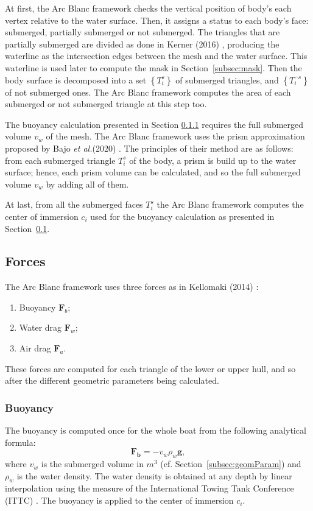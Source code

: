 \documentclass[final]{jcgt}
\def\Framework{The Arc Blanc framework\xspace}
\def\framework{the Arc Blanc framework\xspace}
\def\etal{\emph{et al.}\xspace}
\begin{document}
At first, \framework checks the vertical position of body's each vertex relative to the water surface.
Then, it assigns a status to each body's face: submerged, partially submerged or not submerged.
The triangles that are partially submerged are divided as done in Kerner (2016) \cite{kernerWaterInteractionModel2016}, producing the waterline as the intersection edges between the mesh and the water surface.
This waterline is used later to compute the mask in Section~\ref{subsec:mask}.
Then the body surface is decomposed into a set $\left\lbrace T_i^s\right\rbrace$ of submerged triangles, and $\left\lbrace T_i^{\neg s}\right\rbrace$ of not submerged ones.
\Framework computes the area of each submerged or not submerged triangle at this step too.

The buoyancy calculation presented in Section \ref{subsubsec:buoyancy} requires the full submerged volume $v_w$ of the mesh.
\Framework uses the prism approximation proposed by Bajo \etal (2020) \cite{bajoRealisticBuoyancyModel2020a}.
The principles of their method are as follows: from each submerged triangle $T_i^s$ of the body, a prism is build up to the water surface; hence, each prism volume can be calculated, and so the full submerged volume $v_w$ by adding all of them.

At last, from all the submerged faces $T_i^s$ \framework computes the center of immersion $c_i$ used for the buoyancy calculation as presented in Section~\ref{subsec:forces}.

\subsection{Forces}
\label{subsec:forces}
\Framework uses three forces as in Kellomaki (2014) \cite{kellomakiRigidBodyInteraction2014}:
\begin{enumerate}
	\item Buoyancy $\mathbf{F}_b$;
	\item Water drag $\mathbf{F}_w$;
	\item Air drag $\mathbf{F}_a$.
\end{enumerate}
These forces are computed for each triangle of the lower or upper hull, and so after the different geometric parameters being calculated.

\subsubsection{Buoyancy}
\label{subsubsec:buoyancy}
The buoyancy is computed once for the whole boat from the following analytical formula:
\begin{equation}
	\mathbf{F_b} = - v_w \rho_w \mathbf g,
\end{equation}
where $v_w$ is the submerged volume in $m^3$ (cf. Section~\ref{subsec:geomParam}) and $\rho_w$ is the water density.
The water density is obtained at any depth by linear interpolation using the measure of the International Towing Tank Conference (ITTC) \cite{ittcFreshWaterSeawater2011}.
The buoyancy is applied to the center of immersion $c_i$.
\end{document}
